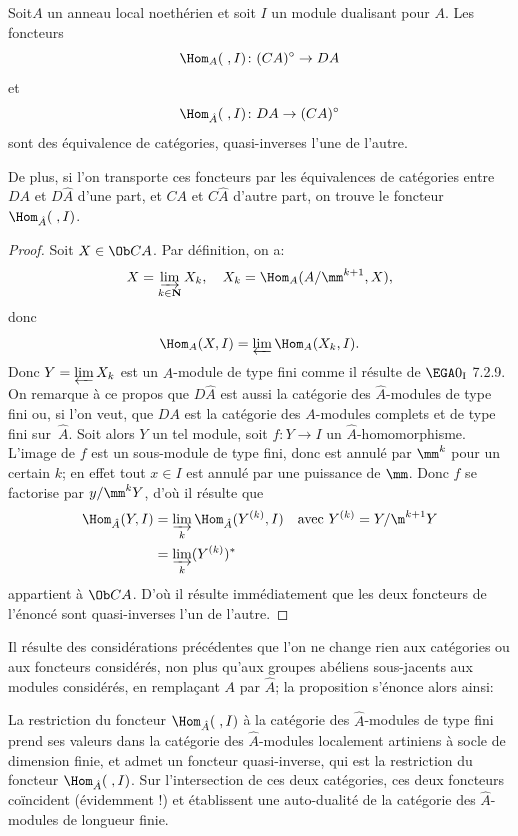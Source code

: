 \begin{proposition} \label{IV.5.1}
Soit\pageoriginale $A$ un anneau local noeth\'erien et soit $I$ un module dualisant pour $A$. Les foncteurs
$$
\Hom_{A}(\;, I)\colon (CA)^{\circ}\to DA
$$
et
$$
\Hom_{\hat{A}}(\;, I)\colon DA\to (CA)^{\circ}
$$
sont des \'equivalence de cat\'egories, quasi-inverses l'une de l'autre.

De plus, si l'on transporte ces foncteurs par les \'equivalences de cat\'egories entre $DA$ et $D\hat{A}$ d'une part, et $CA$ et $C\hat{A}$ d'autre part, on trouve le foncteur $\Hom_{\hat{A}}(\;, I)$.
\end{proposition}

\begin{proof}
Soit $X\in \Ob CA$. Par d\'efinition, on a:
$$
X=\varinjlim_{k\in {\bf N}}X_{k}, \quad X_{k}=\Hom_{A}(A/\mm^{k+1}, X),
$$
donc
$$
\Hom_{A}(X, I)=\varprojlim \Hom_{A}(X_{k}, I).
$$
Donc $Y=\varprojlim X_{k}$ est un $\hat{A}$-module de type fini comme il r\'esulte de $\EGA 0_{\textup{I}}$ 7.2.9. On remarque \`a ce propos que $D\hat{A}$ est aussi la cat\'egorie des $\hat{A}$-modules de type fini ou, si l'on veut, que $DA$ est la cat\'egorie des $A$-modules complets et de type fini sur~$\hat{A}$. Soit alors $Y$ un tel module, soit $f:Y\to I$ un $\hat{A}$-homomorphisme. L'image de $f$ est un sous-module de type fini, donc est annul\'e par $\mm^{k}$ pour un certain $k$; en effet tout $x\in I$ est annul\'e par une puissance de $\mm$. Donc $f$ se factorise par $y/\mm^{k}Y$, d'o\`u il r\'esulte que
\begin{align*}
\Hom_{\hat{A}}(Y, I)&=\varinjlim_k\Hom_{\hat{A}}(Y^{(k)}, I)\quad\text{avec } Y^{(k)}=Y/\m^{k+1}Y\\
&=\varinjlim_k(Y^{(k)})^*
\end{align*}
appartient \`a $\Ob CA$. D'o\`u il r\'esulte imm\'ediatement que les deux foncteurs de l'\'enonc\'e sont quasi-inverses l'un de l'autre.
\skipqed
\end{proof}

Il r\'esulte des consid\'erations pr\'ec\'edentes que l'on ne change rien
aux cat\'egories ou aux foncteurs consid\'er\'es, non plus qu'aux
groupes ab\'eliens sous-jacents aux modules consid\'er\'es, en rempla\c
cant $A$ par $\hat{A}$; la proposition \pageoriginale s'\'enonce alors ainsi:

La restriction du foncteur $\Hom_{\hat{A}}(\;, I)$ \`a la cat\'egorie des $\hat{A}$-modules de type fini prend ses valeurs dans la cat\'egorie des $\hat{A}$-modules localement artiniens \`a socle de dimension finie, et admet un foncteur quasi-inverse, qui est la restriction du foncteur $\Hom_{\hat{A}}(\;, I)$. Sur l'intersection de ces deux cat\'egories, ces deux foncteurs co\"incident (\'evidemment !) et \'etablissent une auto-dualit\'e de la cat\'egorie des $\hat{A}$-modules de longueur finie.

